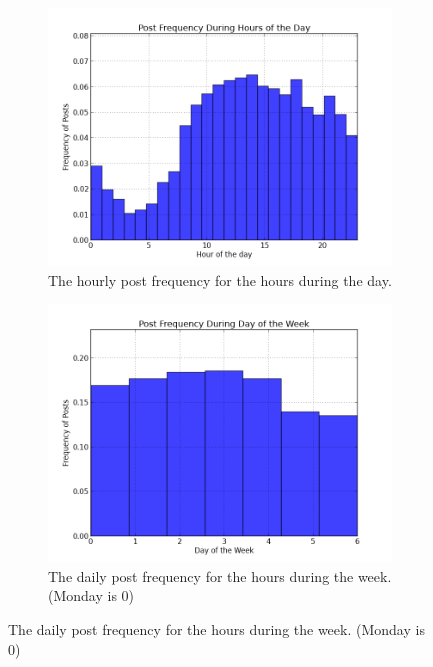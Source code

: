 \begin{figure}
\begin{center}
\begin{subfigure}[b]{0.8\textwidth}
\includegraphics[width=\textwidth]{diagrams/hoursofday.png}
\caption{The hourly post frequency for the hours during the day.}
\label{fig:hr_freq}
	\end{subfigure}
	\begin{subfigure}[b]{0.8\textwidth}
\includegraphics[width=\textwidth]{diagrams/daysofweek.png}
\caption{The daily post frequency for the hours during the week. (Monday is 0)}
\label{fig:week_freq}
	\end{subfigure}
\end{center}
\end{figure}


